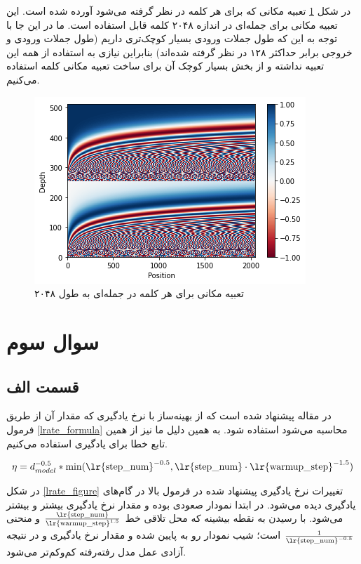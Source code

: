 \documentclass[12pt, a4paper]{book}
\begin{document}
در شکل \ref{position_encoding} تعبیه مکانی که برای هر کلمه در نظر گرفته می‌شود آورده شده است.
این تعبیه مکانی برای جمله‌ای در اندازه ۲۰۴۸ کلمه قابل استفاده است. ما در این جا با توجه
به این که طول جملات ورودی بسیار کوچک‌تری داریم (طول جملات ورودی و خروجی برابر حداکثر ۱۲۸ در نظر گرفته شده‌اند)
بنابراین نیازی به استفاده از همه این تعبیه نداشته و از بخش بسیار کوچک آن برای ساخت تعبیه مکانی کلمه استفاده می‌کنیم.

\begin{figure}
    \centering
    \includegraphics[width=0.5\linewidth]{images/position.png}
    \caption{تعبیه مکانی برای هر کلمه در جمله‌ای به طول ۲۰۴۸}
    \label{position_encoding}
\end{figure}

\section*{سوال سوم}

\subsection*{قسمت الف}

در مقاله‌  پیشنهاد شده است که از بهینه‌ساز  با نرخ یادگیری که
مقدار آن از طریق فرمول \ref{lrate_formula} محاسبه می‌شود استفاده شود. به همین دلیل ما نیز از همین تابع خطا برای یادگیری
استفاده می‌کنیم.

\begin{eqnarray}
    \eta = d_{model}^{-0.5} * \min(\text{\lr{step\_num}}^{-0.5}, \text{\lr{step\_num}} \cdot \text{\lr{warmup\_step}}^{-1.5})
    \label{lrate_formula}
\end{eqnarray}

در شکل \ref{lrate_figure} تغییرات نرخ یادگیری پیشنهاد شده در فرمول بالا در گام‌های یادگیری دیده می‌شود. در ابتدا نمودار صعودی
بوده و مقدار نرخ یادگیری بیشتر و بیشتر می‌شود. با رسیدن به نقطه بیشینه که محل تلاقی خط $\frac{\text{\lr{step\_num}}}{\text{\lr{warmup\_step}}^{1.5}}$
و منحنی $\frac{1}{\text{\lr{step\_num}}^{-0.5}}$ است؛ شیب نمودار رو به پایین شده و مقدار نرخ یادگیری و در نتیجه
آزادی عمل مدل رفته‌رفته کم‌وکم‌تر می‌شود.
\end{document}
